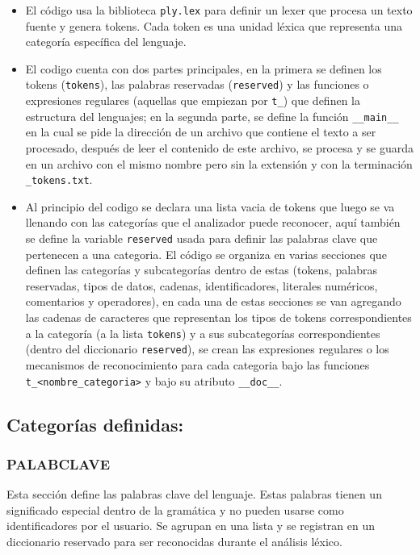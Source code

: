 \documentclass{article}
\begin{document}
\begin{itemize}
  \item El código usa la biblioteca \texttt{ply.lex} para definir un lexer que procesa un texto fuente y genera tokens. Cada token es una unidad léxica que representa una categoría específica del lenguaje.
  \item El codigo cuenta con dos partes principales, en la primera se definen los tokens (\texttt{tokens}), las palabras reservadas (\texttt{reserved}) y las funciones o expresiones regulares (aquellas que empiezan por \texttt{t\_}) que definen la estructura del lenguajes; en la segunda parte, se define la función \texttt{\_\_main\_\_} en la cual se pide la dirección de un archivo que contiene el texto a ser procesado, después de leer el contenido de este archivo, se procesa y se guarda en un archivo con el mismo nombre pero sin la extensión y con la terminación \texttt{\_tokens.txt}.
  \item Al principio del codigo se declara una lista vacia de tokens que luego se va llenando con las categorías que el analizador puede reconocer, aquí también se define la variable \texttt{reserved} usada para definir las palabras clave que pertenecen a una categoria. El código se organiza en varias secciones que definen las categorías y subcategorías dentro de estas (tokens, palabras reservadas, tipos de datos, cadenas, identificadores, literales numéricos, comentarios y operadores), en cada una de estas secciones se van agregando las cadenas de caracteres que representan los tipos de tokens correspondientes a la categoría (a la lista \texttt{tokens}) y a sus subcategorías correspondientes (dentro del diccionario \texttt{reserved}), se crean las expresiones regulares o los mecanismos de reconocimiento para cada categoria bajo las funciones \texttt{t\_<nombre\_categoria>} y bajo su atributo \texttt{\_\_doc\_\_}.
\end{itemize}

\subsection{Categorías definidas:}

\subsubsection{PALABCLAVE}

Esta sección define las palabras clave del lenguaje. Estas palabras tienen un significado especial dentro de la gramática y no pueden usarse como identificadores por el usuario. Se agrupan en una lista y se registran en un diccionario reservado para ser reconocidas durante el análisis léxico.
\end{document}
